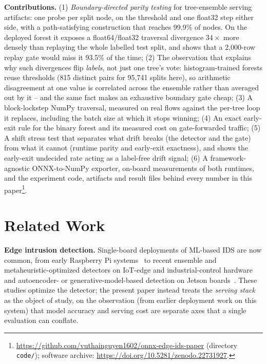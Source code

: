 \documentclass[runningheads]{llncs}
\begin{document}
\textbf{Contributions.}
(1) \emph{Boundary-directed parity testing} for tree-ensemble serving artifacts: one probe per split node, on the threshold and one float32 step either side, with a path-satisfying construction that reaches 99.9\% of nodes. On the deployed forest it exposes a float64/float32 traversal divergence $34\times$ more densely than replaying the whole labelled test split, and shows that a 2{,}000-row replay gate would miss it 93.5\% of the time;
(2) The observation that explains why such divergences flip \emph{labels}, not just one tree's vote: histogram-trained forests reuse thresholds (815 distinct pairs for 95{,}741 splits here), so arithmetic disagreement at one value is correlated across the ensemble rather than averaged out by it -- and the same fact makes an exhaustive boundary gate cheap;
(3) A block-lockstep NumPy traversal, measured on real flows against the per-tree loop it replaces, including the batch size at which it stops winning;
(4) An exact early-exit rule for the binary forest and its measured cost on gate-forwarded traffic;
(5) A shift stress test that separates what drift breaks (the detector and the gate) from what it cannot (runtime parity and early-exit exactness), and shows the early-exit undecided rate acting as a label-free drift signal;
(6) A framework-agnostic ONNX-to-NumPy exporter, on-board measurements of both runtimes, and the experiment code, artifacts and result files behind every number in this paper\footnote{\url{https://github.com/vuthainguyen1602/onnx-edge-ids-paper} (directory \texttt{code/}); software archive: \url{https://doi.org/10.5281/zenodo.22731927}.}.

\section{Related Work}

\textbf{Edge intrusion detection.} Single-board deployments of ML-based IDS are now common, from early Raspberry Pi systems~\cite{sforzin2016rpids} to recent ensemble and metaheuristic-optimized detectors on IoT-edge and industrial-control hardware~\cite{baalaji2025ensemble,asghar2026hedid,zhang2026edgeics} and autoencoder- or generative-model-based detection on Jetson boards~\cite{hasan2025iiot,diazgorrin2026jetson}. These studies optimize the detector; the present paper instead treats the \emph{serving stack} as the object of study, on the observation (from earlier deployment work on this system) that model accuracy and serving cost are separate axes that a single evaluation can conflate.
\end{document}
